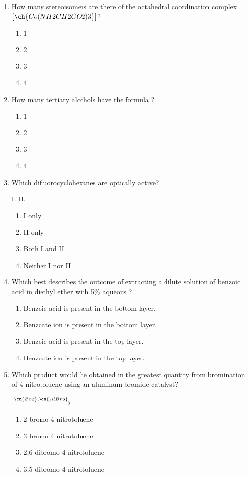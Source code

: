 \documentclass[twocolumn, 10pt]{article}
\begin{document}
\begin{enumerate}
    \item How many stereoisomers are there of the octahedral coordination complex $[\ch{Co(NH2CH2CO2)3}]$?
    \begin{enumerate}
        \item 1
        \item 2
        \item 3
        \item 4
    \end{enumerate}

    \item How many tertiary alcohols have the formula ?
    \begin{enumerate}
        \item 1
        \item 2
        \item 3
        \item 4
    \end{enumerate}

    \item Which difluorocyclohexanes are optically active?
    \begin{center}
        I.  \qquad II. 
    \end{center}
    \begin{enumerate}
        \item I only
        \item II only
        \item Both I and II
        \item Neither I nor II
    \end{enumerate}

    \item Which best describes the outcome of extracting a dilute solution of benzoic acid in diethyl ether with 5\% aqueous ?
    \begin{enumerate}
        \item Benzoic acid is present in the bottom layer.
        \item Benzoate ion is present in the bottom layer.
        \item Benzoic acid is present in the top layer.
        \item Benzoate ion is present in the top layer.
    \end{enumerate}

    \item Which product would be obtained in the greatest quantity from bromination of 4-nitrotoluene using an aluminum bromide catalyst?
    \begin{center}
         \quad $\xrightarrow{\ch{Br2}, \ch{AlBr3}}$
    \end{center}
    \begin{enumerate}
        \item 2-bromo-4-nitrotoluene
        \item 3-bromo-4-nitrotoluene
        \item 2,6-dibromo-4-nitrotoluene
        \item 3,5-dibromo-4-nitrotoluene
    \end{enumerate}


\end{enumerate}
\end{document}
